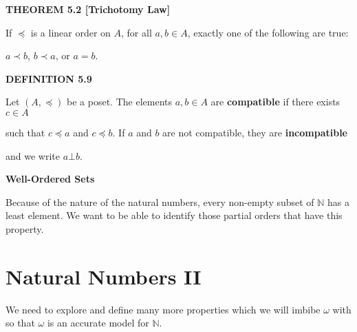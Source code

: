 \documentclass[12pt, a4paper]{article}
\begin{document}
\vspace{4mm}

\noindent\blacksquare\textbf{ THEOREM 5.2 [Trichotomy Law]}\par

\vspace{4mm}

If $\preceq$ is a linear order on $A$, for all $a,b\in A$, exactly one of the following are true:\par
$a\prec b$, $b\prec a$, or $a=b$.\par

\vspace{4mm}

\noindent\blacksquare\textbf{ DEFINITION 5.9}\par

\vspace{4mm}

Let $(A,\preceq)$ be a poset. The elements $a,b\in A$ are \textbf{compatible} if there exists $c\in A$\par such that $c\preceq a$ and $c\preceq b$. If $a$ and $b$ are not compatible, they are \textbf{incompatible}\par and we write $a\bot b$.\par

\vspace{4mm}

\noindent\large\textbf{Well-Ordered Sets}\normalsize\par

\vspace{4mm}

\noindent Because of the nature of the natural numbers, every non-empty subset of $\mathbb{N}$ has a least element. We want to be able to identify those partial orders that have this property.\par

\vspace{4mm}

\newpage

\section{Natural Numbers II}

\noindent We need to explore and define many more properties which we will imbibe $\omega$ with so that $\omega$ is an accurate model for $\mathbb{N}$.\par

\vspace{4mm}
\end{document}
